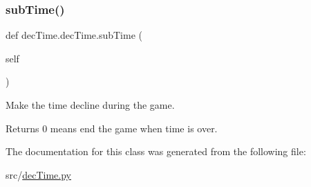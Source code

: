 \subsubsection{\texorpdfstring{subTime()}{subTime()}}
{\footnotesize\ttfamily def dec\+Time.\+dec\+Time.\+sub\+Time (\begin{DoxyParamCaption}\item[{}]{self }\end{DoxyParamCaption})}



Make the time decline during the game. 

\begin{DoxyReturn}{Returns}
0 means end the game when time is over. 
\end{DoxyReturn}


The documentation for this class was generated from the following file\+:\begin{DoxyCompactItemize}
\item 
src/\mbox{\hyperlink{dec_time_8py}{dec\+Time.\+py}}\end{DoxyCompactItemize}
